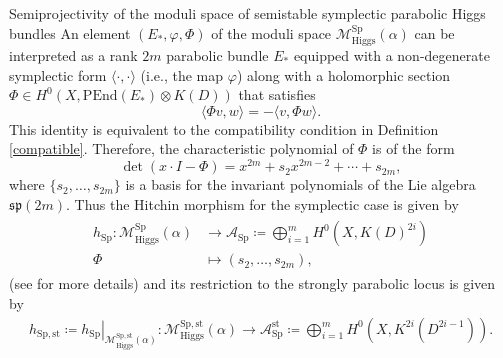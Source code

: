 \documentclass[11pt, reqno]{amsart}
\makeatletter
\numberwithin{equation}{section}
\def\subsection{\@startsection{subsection}{2}%
  \normalparindent{.5\linespacing\@plus.7\linespacing}{-.5em}%
  {\normalfont\bfseries}}
\theoremstyle{definition}
\makeatother
\begin{document}
\subsection{Semiprojectivity of the moduli space of semistable symplectic parabolic Higgs bundles}
An element $(E_*,\varphi,\Phi)$ of the moduli space $\mathcal{M}^{\mathrm{Sp}}_{\mathrm{Higgs}}(\alpha)$ can be interpreted as a rank $2m$ parabolic bundle $E_*$ equipped with a non-degenerate symplectic form $\langle \cdot , \cdot \rangle$ (i.e., the map $\varphi$) along with a holomorphic section $\Phi \in H^0(X, \mathrm{PEnd}(E_*)\otimes K(D))$ that satisfies
\[
\langle \Phi v, w \rangle = - \langle v, \Phi w \rangle.
\]
This identity is equivalent to the compatibility condition in Definition \ref{compatible}. Therefore, the characteristic polynomial of $\Phi$ is of the form
\[
\det(x\cdot I - \Phi) = x^{2m} + s_2x^{2m-2} + \cdots + s_{2m},
\]
where $\{s_2,\dots, s_{2m}\}$ is a basis for the invariant polynomials of the Lie algebra $\mathfrak{sp}(2m)$. Thus the Hitchin morphism for the symplectic case is given by
\begin{align}
\begin{split}
    h_{\mathrm{Sp}} : \mathcal{M}^{\mathrm{Sp}}_{\mathrm{Higgs}}(\alpha) &\rightarrow \mathcal{A}_{\mathrm{Sp}}\coloneqq \bigoplus_{i=1}^{m}H^0(X, K(D)^{2i})\\
    \Phi &\longmapsto (s_2,\dots,s_{2m}),
    \end{split}
\end{align}
(see \cite{R20} for more details) and its restriction to the strongly parabolic locus is given by
\begin{align}
    h_{\mathrm{Sp,st}} \coloneqq \left.h_{\mathrm{Sp}}\right|_{\mathcal{M}^{\mathrm{Sp,st}}_{\mathrm{Higgs}}(\alpha)}: \mathcal{M}^{\mathrm{Sp,st}}_{\mathrm{Higgs}}(\alpha) \rightarrow \mathcal{A}^{\mathrm{st}}_{\mathrm{Sp}}\coloneqq \bigoplus_{i=1}^{m}H^0(X, K^{2i}(D^{2i-1})).
\end{align}
\end{document}
